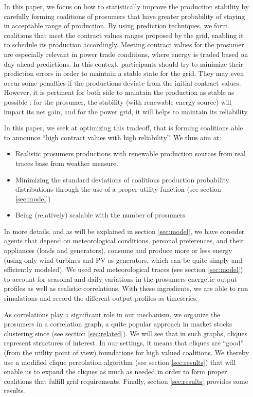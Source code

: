 \documentclass[conference]{IEEEtran}
\begin{document}
In this paper, we focus on how to statistically improve the production stability by carefully forming coalitions of prosumers that have greater probability of staying in acceptable range of production. By using prediction techniques, we form coalitions that meet the contract values ranges proposed by the grid, enabling it to schedule its production accordingly. Meeting contract values for the prosumer are especially relevant in power trade conditions, where energy is traded based on day-ahead predictions. In this context, participants should try to minimize their prediction errors in order to maintain a stable state for the grid. They may even occur some penalties if the productions deviate from the initial contract values. However, it is pertinent for both side to maintain the production as stable as possible : for the prosumer, the stability (with renewable energy source) will impact its net gain, and for the power grid, it will helps to maintain its reliability.

In this paper, we seek at optimizing this tradeoff, that is forming coalitions able to announce “high contract values with high reliability”. We thus aim at:
\begin{itemize}
\item Realistic prosumers productions with renewable production sources from real traces base from weather measure.
\item Minimizing the standard deviations of coalitions production probability distributions through the use of a proper utility function (see section \ref{sec:model})
\item Being (relatively) scalable with the number of prosumers
\end{itemize}

In more details, and as will be explained in section \ref{sec:model}, we have consider agents that depend on meteorological conditions, personal preferences, and their appliances (loads and generators), consume and produce more or less energy (using only wind turbines and PV as generators, which can be quite simply and efficiently modeled). We used real meteorological traces (see section \ref{sec:model}) to account for seasonal and daily variations in the prosumers energetic output profiles as well as realistic correlations. With these ingredients, we are able to run simulations and record the different output profiles as timeseries.

As correlations play a significant role in our mechanism, we organize the prosumers in a correlation graph, a quite popular approach in market stocks clustering since \cite{Mantegna1999} (see section \ref{sec:related}). We will see that in such graphs, cliques represent structures of interest. In our settings, it means that cliques are “good” (from the utility point of view) foundations for high valued coalitions. We thereby use a modified clique percolation algorithm (see section \ref{sec:results}) that will enable us to expand the cliques as much as needed in order to form proper coalitions that fulfill grid requirements. Finally, section \ref{sec:results} provides some results.
\end{document}
